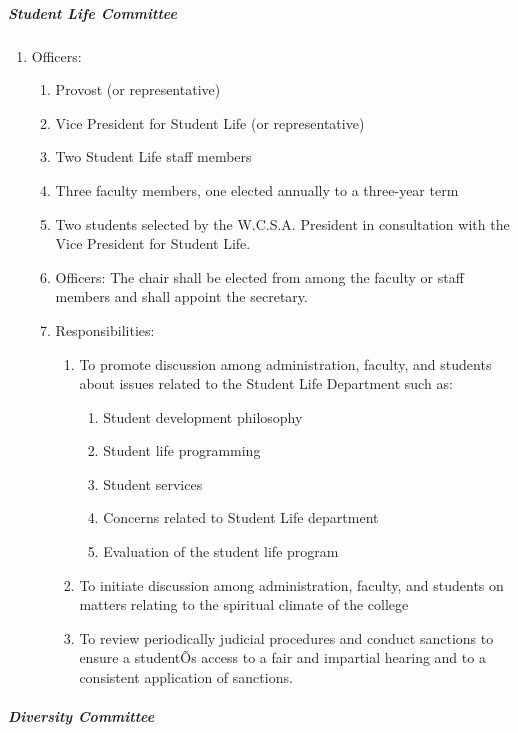 \documentclass[letterpaper, 11pt]{article}
\begin{document}
				\subparagraph{Student Life Committee}
					\begin{enumerate}[label=\alph*)]
						\item{Officers:
							\begin{enumerate}[label=\arabic*)]
								\item{Provost (or representative)}
								\item{Vice President for Student Life (or representative)}
								\item{Two Student Life staff members}
								\item{Three faculty members, one elected annually to a three-year term}
								\item{Two students selected by the W.C.S.A. President in consultation with the Vice President for Student Life.}
								\item{Officers:}
								The chair shall be elected from among the faculty or staff members and shall appoint the secretary.
								\item{Responsibilities:
									\begin{enumerate}[label=\arabic*)]
										\item{To promote discussion among administration, faculty, and students about issues related to the Student Life Department such as:
											\begin{enumerate}[label=(\alph*)]
												\item{Student development philosophy}
												\item{Student life programming}
												\item{Student services}
												\item{Concerns related to Student Life department}
												\item{Evaluation of the student life program}
											\end{enumerate}
										}
										\item{To initiate discussion among administration, faculty, and students on matters relating to the spiritual climate of the college}
										\item{To review periodically judicial procedures and conduct sanctions to ensure a studentÕs access to a fair and impartial hearing and to a consistent application of sanctions.}
									\end{enumerate}
								}
							\end{enumerate}
						}
					\end{enumerate}
				\subparagraph{Diversity Committee}
\end{document}
